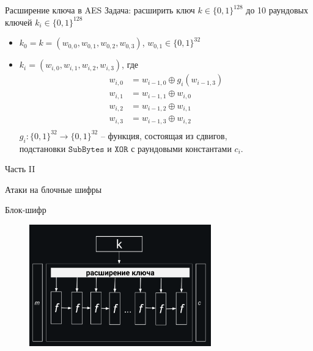 \documentclass[usenames,dvipsnames,8pt,aspectratio=169]{beamer}
\begin{document}
\begin{frame}{Расширение ключа в AES}
	\Large
	Задача: расширить ключ $k  \in \{0,1\}^{128}$ до 10 раундовых ключей $k_i \in \{0,1\}^{128}$
	
	\vspace{20pt}
	
	\LARGE
	\begin{itemize}
		\itemsep 10pt
		\item $k_0 = k = (w_{0,0}, w_{0,1}, w_{0,2}, w_{0,3})$, $w_{0,1} \in \{0,1\}^{32}$
		
		\item $k_i = (w_{i,0}, w_{i,1}, w_{i,2}, w_{i,3})$, где
		\begin{align*}
			w_{i,0} &= w_{i-1, 0} \oplus g_i(w_{i-1, 3}) \\	
			w_{i,1} &= w_{i-1, 1} \oplus w_{i, 0} \\
			w_{i,2} &= w_{i-1, 2} \oplus w_{i, 1} \\
			w_{i,3} &= w_{i-1, 3} \oplus w_{i, 2} \\
		\end{align*}
		$g_i : \{0,1\}^{32} \rightarrow \{0,1\}^{32}  $ -- функция, состоящая из сдвигов, \\ подстановки $\mathtt{SubBytes}$ и $\mathtt{XOR}$ с раундовыми константами $c_i$.
	\end{itemize}
\end{frame}

\begin{frame}
Часть II \\ [10pt]
\begin{LARGE}
	
	\color{Orange}
	\Huge Атаки на блочные шифры
	
\end{LARGE}
\end{frame}

\begin{frame}{Блок-шифр}
\begin{figure}
	\includegraphics[width=0.7\textwidth]{BlockCipherGeneral}
\end{figure}

\end{frame}
\end{document}
